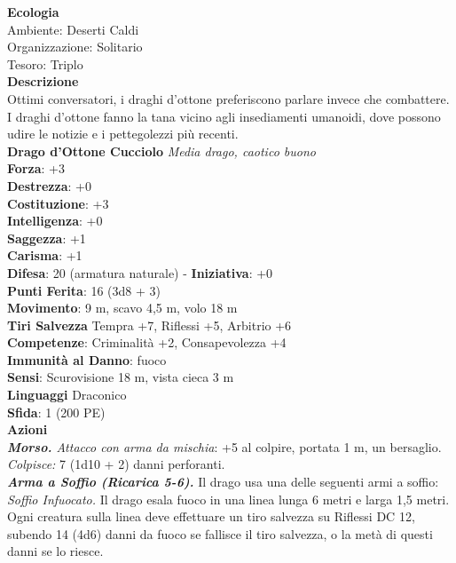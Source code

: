 \begin{multicols}{2}
\textbf{Ecologia}\\
Ambiente: Deserti Caldi\\
Organizzazione: Solitario\\
Tesoro: Triplo\\
\textbf{Descrizione}\\
Ottimi conversatori, i draghi d’ottone preferiscono parlare invece che combattere. I draghi d’ottone fanno la tana vicino agli insediamenti umanoidi, dove possono udire le notizie e i pettegolezzi più recenti.\\


\medskip\textbf{Drago d'Ottone Cucciolo}
\emph{Media drago, caotico buono}\\
\textbf{Forza}: +3\\
\textbf{Destrezza}: +0\\
\textbf{Costituzione}: +3\\
\textbf{Intelligenza}: +0\\
\textbf{Saggezza}: +1\\
\textbf{Carisma}: +1\\
\textbf{Difesa}: 20 (armatura naturale) - \textbf{Iniziativa}: +0\\
\textbf{Punti Ferita}: 16 (3d8 + 3)\\
\textbf{Movimento}: 9 m, scavo 4,5 m, volo 18 m\\
\textbf{Tiri Salvezza} Tempra +7, Riflessi +5, Arbitrio +6\\
\textbf{Competenze}: Criminalità +2, Consapevolezza +4\\
\textbf{Immunità al Danno}: fuoco\\
\textbf{Sensi}: Scurovisione 18 m, vista cieca 3 m\\
\textbf{Linguaggi} Draconico\\
\textbf{Sfida}: 1 (200 PE)\smallskip\\
\smallskip\textbf{Azioni}\\
\emph{\textbf{Morso.} Attacco con arma da mischia}: +5 al colpire, portata 1 m, un bersaglio.\\
\emph{Colpisce:} 7 (1d10 + 2) danni perforanti.\\
\emph{\textbf{Arma a Soffio (Ricarica 5-6).}} Il drago usa una delle seguenti armi a soffio:\\
\emph{Soffio Infuocato.} Il drago esala fuoco in una linea lunga 6 metri e larga 1,5 metri. Ogni creatura sulla linea deve effettuare un tiro salvezza su Riflessi DC  12, subendo 14 (4d6) danni da fuoco se fallisce il tiro salvezza, o la metà di questi danni se lo riesce.\\

\end{multicols}
